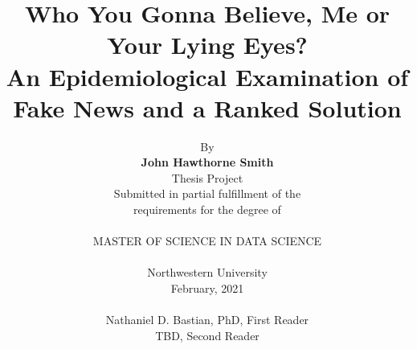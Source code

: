 \documentclass[preprint,review,12pt]{elsarticle}
\begin{document}
\begin{frontmatter}



\title{Who You Gonna Believe, Me or Your Lying Eyes?\\
An Epidemiological Examination of Fake News and a Ranked Solution}


\author{By \\\textbf{John Hawthorne Smith} \\Thesis Project \\Submitted in partial fulfillment of the \\requirements for the degree of \\ \\MASTER OF SCIENCE IN DATA SCIENCE \\ \\Northwestern University \\February, 2021 \\ \\Nathaniel D. Bastian, PhD, First Reader \\TBD, Second Reader}



\end{frontmatter}
\end{document}
